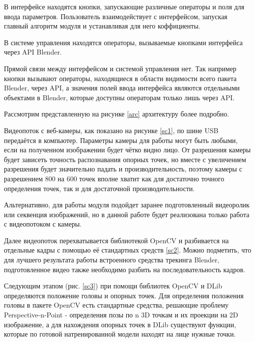 В интерфейсе находятся кнопки, запускающие различные операторы и поля для ввода параметров. Пользователь взаимодействует с интерфейсом, запуская главный алгоритм модуля и устанавливая для него коффициенты.

В системе управления находятся операторы, вызываемые кнопками интерфейса через API Blender.

Прямой связи между интерфейсом и системой управления нет. Так например кнопки вызывают операторы, находящиеся в области видимости всего пакета Blender, через API, а значения полей ввода интерфейса являются отдельными объектами в Blender, которые доступны операторам только лишь через API.


Рассмотрим представленную на рисунке \ref{arc} архитектуру более подробно.

Видеопоток с веб-камеры, как показано на рисунке \ref{sc1}, по шине USB передаётся в компьютер. Параметры камеры для работы могут быть любыми, если на полученном изображении будет чётко видно лицо. От разрешения камеры будет зависеть точность распознавания опорных точек, но вместе с увеличением разрешения будет значительно падать и производительность, поэтому камеры с разрешением 800 на 600 точек вполне хватит как для достаточно точного определения точек, так и для достаточной производительности.

Альтернативно, для работы модуля подойдет заранее подготовленный видеоролик или секвенция изображений, но в данной работе будет реализована только работа с видеопотоком с камеры.


Далее видеопоток перехватывается библиотекой OpenCV и разбивается на отдельные кадры с помощью её стандартных средств \ref{sc2}. Можно подметить, что для лучшего результата работы встроенного средства трекинга Blender, подготовленное видео также необходимо разбить на последовательность кадров.


Следующим этапом (рис. \ref{sc3}) при помощи библиотек OpenCV и DLib определяются положение головы и опорных точек. Для определения положения головы в пакете OpenCV есть стандартные средства, решающие проблему Perspective-n-Point - определения позы по n 3D точкам и их проекции на 2D изображение, а для нахождения опорных точек в DLib существуют функции, которые по готовой натренированной модели находят на лице нужные точки. 

